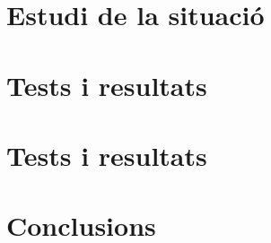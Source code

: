 \chapter{Estudi de la situació}

\chapter{Tests i resultats}

\chapter{Tests i resultats}

\chapter{Conclusions}

